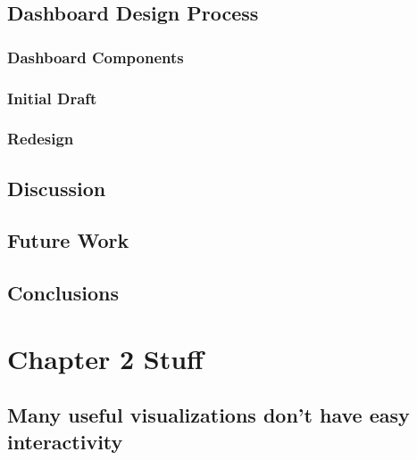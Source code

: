 \documentclass[print]{nuthesis}
\begin{document}
\hypertarget{dashboard-design-process}{%
\section{Dashboard Design Process}\label{dashboard-design-process}}

\hypertarget{dashboard-components}{%
\subsection{Dashboard Components}\label{dashboard-components}}

\hypertarget{initial-draft}{%
\subsection{Initial Draft}\label{initial-draft}}

\hypertarget{redesign}{%
\subsection{Redesign}\label{redesign}}

\hypertarget{discussion}{%
\section{Discussion}\label{discussion}}

\hypertarget{future-work}{%
\section{Future Work}\label{future-work}}

\hypertarget{conclusions}{%
\section{Conclusions}\label{conclusions}}

\hypertarget{math-sci}{%
\chapter{Chapter 2 Stuff}\label{math-sci}}

\hypertarget{many-useful-visualizations-dont-have-easy-interactivity}{%
\section{Many useful visualizations don't have easy interactivity}\label{many-useful-visualizations-dont-have-easy-interactivity}}
\end{document}
